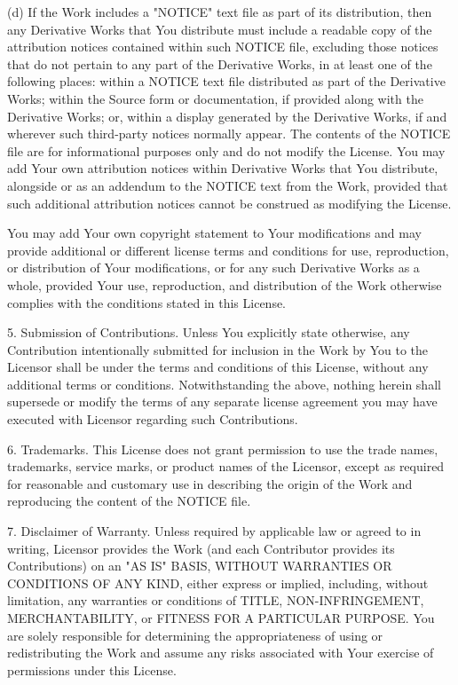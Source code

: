 \documentclass[a4paper,twoside]{tceusermanual}
\begin{document}
      (d) If the Work includes a "NOTICE" text file as part of its
          distribution, then any Derivative Works that You distribute must
          include a readable copy of the attribution notices contained
          within such NOTICE file, excluding those notices that do not
          pertain to any part of the Derivative Works, in at least one
          of the following places: within a NOTICE text file distributed
          as part of the Derivative Works; within the Source form or
          documentation, if provided along with the Derivative Works; or,
          within a display generated by the Derivative Works, if and
          wherever such third-party notices normally appear. The contents
          of the NOTICE file are for informational purposes only and
          do not modify the License. You may add Your own attribution
          notices within Derivative Works that You distribute, alongside
          or as an addendum to the NOTICE text from the Work, provided
          that such additional attribution notices cannot be construed
          as modifying the License.

      You may add Your own copyright statement to Your modifications and
      may provide additional or different license terms and conditions
      for use, reproduction, or distribution of Your modifications, or
      for any such Derivative Works as a whole, provided Your use,
      reproduction, and distribution of the Work otherwise complies with
      the conditions stated in this License.

   5. Submission of Contributions. Unless You explicitly state otherwise,
      any Contribution intentionally submitted for inclusion in the Work
      by You to the Licensor shall be under the terms and conditions of
      this License, without any additional terms or conditions.
      Notwithstanding the above, nothing herein shall supersede or modify
      the terms of any separate license agreement you may have executed
      with Licensor regarding such Contributions.

   6. Trademarks. This License does not grant permission to use the trade
      names, trademarks, service marks, or product names of the Licensor,
      except as required for reasonable and customary use in describing the
      origin of the Work and reproducing the content of the NOTICE file.

   7. Disclaimer of Warranty. Unless required by applicable law or
      agreed to in writing, Licensor provides the Work (and each
      Contributor provides its Contributions) on an "AS IS" BASIS,
      WITHOUT WARRANTIES OR CONDITIONS OF ANY KIND, either express or
      implied, including, without limitation, any warranties or conditions
      of TITLE, NON-INFRINGEMENT, MERCHANTABILITY, or FITNESS FOR A
      PARTICULAR PURPOSE. You are solely responsible for determining the
      appropriateness of using or redistributing the Work and assume any
      risks associated with Your exercise of permissions under this License.
\end{document}
